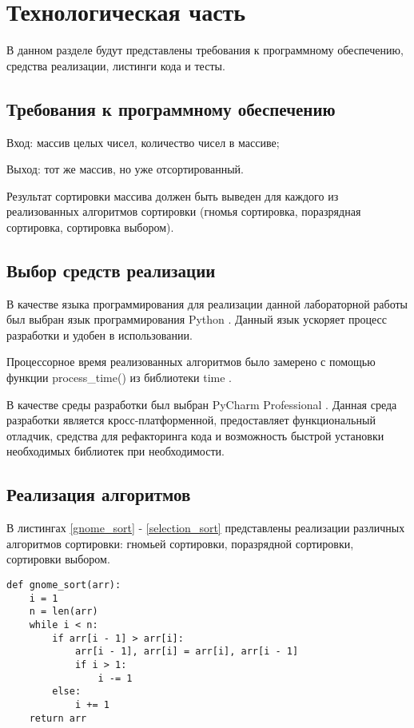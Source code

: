 \chapter{Технологическая часть}

В данном разделе будут представлены требования к программному обеспечению, средства реализации, листинги кода и тесты.

\section{Требования к программному обеспечению}
Вход: массив целых чисел, количество чисел в массиве;

Выход: тот же массив, но уже отсортированный.

Результат сортировки массива должен быть выведен для каждого из реализованных алгоритмов сортировки (гномья сортировка, поразрядная сортировка, сортировка выбором).

\section{Выбор средств реализации}

В качестве языка программирования для реализации данной лабораторной работы был выбран язык программирования Python  \cite{PythonBook}. Данный язык ускоряет процесс разработки и удобен в использовании.

Процессорное время реализованных алгоритмов было замерено с помощью функции process\_time() из библиотеки time \cite{process_time_text}.

В качестве среды разработки был выбран PyCharm Professional \cite{pycharm}. Данная среда разработки является кросс-платформенной, предоставляет функциональный отладчик, средства для рефакторинга кода и возможность быстрой установки необходимых библиотек при необходимости.

\section{Реализация алгоритмов}

В листингах \ref{gnome_sort} - \ref{selection_sort} представлены реализации различных алгоритмов сортировки: гномьей сортировки, поразрядной сортировки, сортировки выбором.

\begin{lstlisting}[caption=Функция алгоритма гномьей сортировки, 
    label={gnome_sort}]
def gnome_sort(arr):
    i = 1
    n = len(arr)
    while i < n:
        if arr[i - 1] > arr[i]:
            arr[i - 1], arr[i] = arr[i], arr[i - 1]
            if i > 1:
                i -= 1
        else:
            i += 1
    return arr
\end{lstlisting}


